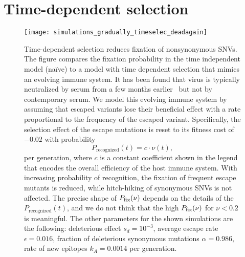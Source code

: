
\section{Time-dependent selection}
\begin{figure}[h]
\begin{center}
\texttt{[image: simulations\_gradually\_timeselec\_deadagain]}
\caption{
Time-dependent selection reduces fixation of nonsynonymous SNVs. The figure
compares the fixation probability in the time independent model (na\"ive) to
a model with time dependent selection that mimics  an evolving immune system.
It has been found that virus is typically neutralized by serum from a few months
earlier~\citep{richman_rapid_2003} but not by contemporary serum. We model this
evolving immune system by assuming that escaped variants lose their beneficial
effect with a rate proportional to the frequency of the escaped variant. 
Specifically, the selection effect of the escape mutations is
reset to its fitness cost of $-0.02$ with probability
\[ P_\text{recognized}(t) = c \cdot \nu(t), \] 
per generation, where $c$ is a constant coefficient shown in the legend that
encodes the overall efficiency of the host immune system. With increasing
probability of recognition, the fixation of frequent escape mutants is reduced,
while hitch-hiking of synonymous SNVs is not affected. The precise
shape of $P_{\mathrm{fix}}(\nu)$ depends on the details of the $P_\text{recognized}(t)$, and 
we do not think that the high $P_{\mathrm{fix}}(\nu)$ for $\nu<0.2$ is meaningful.
The other parameters for the shown simulations are
the following: deleterious effect $s_d = 10^{-3}$, average escape rate $\epsilon = 0.016$,
fraction of deleterious synonymous mutations $\alpha = 0.986$, rate of new epitopes
$k_A=0.0014$ per generation.
}
\label{fig:tds}
\end{center}
\end{figure}

